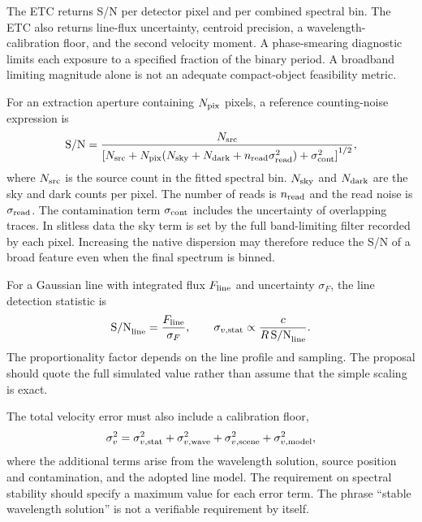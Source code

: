\documentclass[10pt,onecolumn]{article}
\begin{document}
The ETC returns S/N per detector pixel and per combined spectral bin. The ETC
also returns line-flux uncertainty, centroid precision, a
wavelength-calibration floor, and the second velocity moment. A phase-smearing
diagnostic limits each exposure to a specified fraction of the binary period.
A broadband limiting magnitude alone is not an adequate compact-object
feasibility metric.

For an extraction aperture containing $N_{\rm pix}$ pixels, a reference
counting-noise expression is
\begin{equation}
 {\rm S/N} =
 \frac{N_{\rm src}}
 {\left[N_{\rm src}+N_{\rm pix}
 (N_{\rm sky}+N_{\rm dark}+n_{\rm read}\sigma_{\rm read}^2)
 +\sigma_{\rm cont}^2\right]^{1/2}},
 \label{eq:snr_budget}
\end{equation}
where $N_{\rm src}$ is the source count in the fitted spectral bin.
$N_{\rm sky}$ and $N_{\rm dark}$ are the sky and dark counts per pixel.
The number of reads is $n_{\rm read}$ and the read noise is
$\sigma_{\rm read}$. The contamination term $\sigma_{\rm cont}$ includes the
uncertainty of overlapping traces. In slitless data the sky term is set by the
full band-limiting filter recorded by each pixel. Increasing the native
dispersion may therefore reduce the S/N of a broad feature even when the final
spectrum is binned.

For a Gaussian line with integrated flux $F_{\rm line}$ and uncertainty
$\sigma_F$, the line detection statistic is
\begin{equation}
  {\rm S/N}_{\rm line} = \frac{F_{\rm line}}{\sigma_F},
  \qquad
  \sigma_{v,\rm stat} \propto
  \frac{c}{R\,{\rm S/N}_{\rm line}}.
  \label{eq:line_precision}
\end{equation}
The proportionality factor depends on the line profile and sampling. The
proposal should quote the full simulated value rather than assume that the
simple scaling is exact.

The total velocity error must also include a calibration floor,
\begin{equation}
 \sigma_v^2=\sigma_{v,\rm stat}^2+\sigma_{v,\rm wave}^2+
 \sigma_{v,\rm scene}^2+\sigma_{v,\rm model}^2 ,
 \label{eq:velocity_budget}
\end{equation}
where the additional terms arise from the wavelength solution, source
position and contamination, and the adopted line model. The requirement on
spectral stability should specify a maximum value for each error term. The
phrase
``stable wavelength solution'' is not a verifiable requirement by itself.
\end{document}
